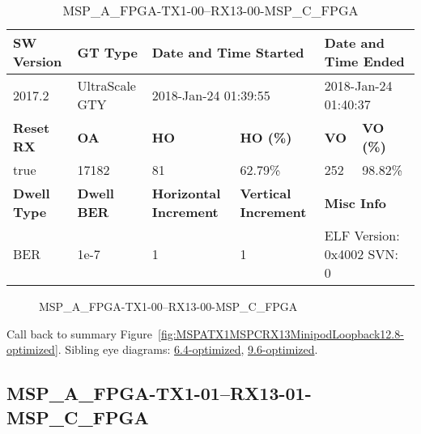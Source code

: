 \begin{table}[h]
\centering
\caption{MSP\_A\_FPGA-TX1-00--RX13-00-MSP\_C\_FPGA}
\label{tab:MSPAFPGATX100RX1300MSPCFPGA12.8-optimized}
\begin{tabular}{@{}|l|l|l|l|l|l|@{}}
\toprule
\textbf{SW Version}                & \textbf{GT Type}   & \multicolumn{2}{l|}{\textbf{Date and Time Started}}            & \multicolumn{2}{l|}{\textbf{Date and Time Ended}}        \\ \midrule
2017.2                       & UltraScale GTY          & \multicolumn{2}{l|}{2018-Jan-24 01:39:55}                   & \multicolumn{2}{l|}{2018-Jan-24 01:40:37}               \\ \midrule
\textbf{Reset RX}                  & \textbf{OA} & \textbf{HO}   & \textbf{HO (\%)} & \textbf{VO} & \textbf{VO (\%)} \\ \midrule
true & 17182        & 81          & 62.79\%        & 252        & 98.82\%       \\ \midrule
\textbf{Dwell Type}                & \textbf{Dwell BER} & \textbf{Horizontal Increment} & \textbf{Vertical Increment}    & \multicolumn{2}{l|}{\textbf{Misc Info}}                  \\ \midrule
BER                            & 1e-7        & 1        & 1           & \multicolumn{2}{l|}{ELF Version: 0x4002 SVN: 0}                         \\ \bottomrule
\end{tabular}
\end{table}

\begin{figure}[h]
\caption{MSP\_A\_FPGA-TX1-00--RX13-00-MSP\_C\_FPGA} \label{fig:MSPAFPGATX100RX1300MSPCFPGA12.8-optimized}
\end{figure}

Call back to summary Figure~\ref{fig:MSPATX1MSPCRX13MinipodLoopback12.8-optimized}.
Sibling eye diagrams: \hyperref[sec:MSPAFPGATX100RX1300MSPCFPGA6.4-optimized]{6.4-optimized}, \hyperref[sec:MSPAFPGATX100RX1300MSPCFPGA9.6-optimized]{9.6-optimized}.

\clearpage
\newpage


\subsection{MSP\_A\_FPGA-TX1-01--RX13-01-MSP\_C\_FPGA}\label{sec:MSPAFPGATX101RX1301MSPCFPGA12.8-optimized}


